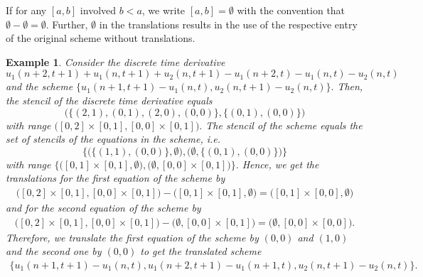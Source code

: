 \documentclass[manuscript]{acmart}
\newcommand{\1}{{\chi}}
\numberwithin{equation}{section}
\theoremstyle{thmlemcorr}
\numberwithin{theorem}{section}
\theoremstyle{thmlemcorr*}
\theoremstyle{defi}
\theoremstyle{remexample}
\newtheorem{example}[theorem]{Example}
\theoremstyle{ass}
\begin{document}
If for any $[a,b]$ involved $b<a$, we write $[a,b]=\emptyset$ with the convention that $\emptyset-\emptyset=\emptyset$.  Further, $\emptyset$ in the translations results in the use of the respective entry of the original scheme without translations.
	\begin{example}
		Consider the discrete time derivative
		\footnotesize
		\begin{equation*}
			u_1(n+2,t+1)+u_1(n,t+1)+u_2(n,t+1)-u_1(n+2,t)-u_1(n,t)-u_2(n,t)
		\end{equation*}
		\normalsize
		and the scheme
		\footnotesize
		$
			\{u_1(n+1,t+1)-u_1(n,t),u_2(n,t+1)-u_2(n,t)\}.
		$
		\normalsize
		Then, the stencil of the discrete time derivative equals
		\footnotesize
		\begin{equation*}
			\Big( \big\{ (2,1),(0,1),(2,0),(0,0) \big\},\big\{(0,1),(0,0)\big\} \Big)
		\end{equation*}
		\normalsize
		with range
		\footnotesize
		$
			\Big([0,2]\times[0,1],[0,0]\times [0,1]\Big).
		$
		\normalsize
		The stencil of the scheme equals the set of stencils of the equations in the scheme, i.e.
		\footnotesize
		\begin{equation*}
			\Big\{\Big(\big\{(1,1),(0,0)\big\},\emptyset\Big),\Big(\emptyset,\big\{(0,1),(0,0)\big\}\Big)\Big\}
		\end{equation*}
		\normalsize
		with range
		\footnotesize
		$
			\Big\{\Big([0,1]\times[0,1],\emptyset\Big),\Big(\emptyset,[0,0]\times [0,1]\Big)\Big\}.
		$
		\normalsize
		Hence, we get the translations for the first equation of the scheme by
		\footnotesize
		\begin{gather*}
			\Big([0,2]\times[0,1],[0,0]\times [0,1]\Big)-\Big([0,1]\times[0,1],\emptyset\Big)=\Big([0,1]\times[0,0],\emptyset\Big)
		\end{gather*}
		\normalsize
		and for the second equation of the scheme by
		\footnotesize
		\begin{gather*}
			\Big([0,2]\times[0,1],[0,0]\times [0,1]\Big)-\Big(\emptyset,[0,0]\times [0,1]\Big)=\Big(\emptyset,[0,0]\times [0,0]\Big).
		\end{gather*}
		\normalsize
		Therefore, we translate the first equation of the scheme by $(0,0)$ and $(1,0)$ and the second one by $(0,0)$ to get the translated scheme
		\footnotesize
		\begin{gather*}
			\{u_1(n+1,t+1)-u_1(n,t),
			u_1(n+2,t+1)-u_1(n+1,t),
			u_2(n,t+1)-u_2(n,t)
			\}.
		\end{gather*}
		\normalsize
	\end{example}
\end{document}
